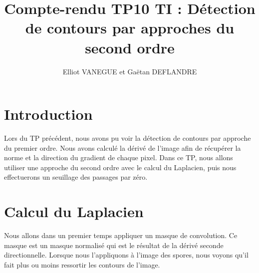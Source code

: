 \documentclass[a4paper,11pt]{article}
\title{Compte-rendu TP10 TI : Détection de contours par approches du second ordre}
\author{Elliot VANEGUE et Gaëtan DEFLANDRE}
\begin{document}


  \maketitle
  
  \mbox{}
  \newpage
  \clearpage
  
  \section{Introduction}
   Lors du TP précédent, nous avons pu voir la détection de contours par approche du premier ordre. Nous avons
   calculé la dérivé de l'image afin de récupérer la norme et la direction du gradient de chaque pixel. Dans ce TP,
   nous allons utiliser une approche du second ordre avec le calcul du Laplacien, puis nous effectuerons un seuillage
   des passages par zéro.

  \section{Calcul du Laplacien}
  Nous allons dans un premier temps appliquer un masque de convolution. Ce masque est un masque normalisé
  qui est le résultat de la dérivé seconde directionnelle. Lorsque nous l'appliquons à l'image des spores, nous
  voyons qu'il fait plus ou moins ressortir les contours de l'image.\\
  
\end{document}
